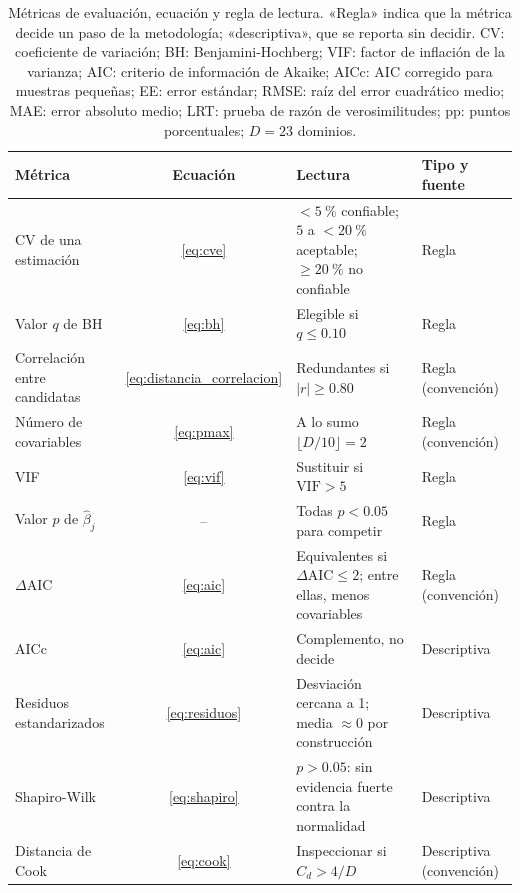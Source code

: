 \begin{table}[!htbp]
\centering
\small
\caption{Métricas de evaluación, ecuación y regla de lectura. «Regla» indica que la métrica decide un paso de la metodología; «descriptiva», que se reporta sin decidir. CV: coeficiente de variación; BH: Benjamini-Hochberg; VIF: factor de inflación de la varianza; AIC: criterio de información de Akaike; AICc: AIC corregido para muestras pequeñas; EE: error estándar; RMSE: raíz del error cuadrático medio; MAE: error absoluto medio; LRT: prueba de razón de verosimilitudes; pp: puntos porcentuales; $D = 23$ dominios.}
\label{tab:criterios_decision}
\renewcommand{\arraystretch}{1.2}
\begin{tabularx}{\linewidth}{>{\raggedright\arraybackslash}p{3.0cm} c >{\raggedright\arraybackslash}X >{\raggedright\arraybackslash}p{2.2cm}}
\toprule
Métrica & Ecuación & Lectura & Tipo y fuente \\
\midrule
CV de una estimación & \ref{eq:cve} & $<5~\%$ confiable; $5$ a $<20~\%$ aceptable; $\geq 20~\%$ no confiable & Regla \cite{DANE_GEIH_Metodologia2016, Molina2019} \\
Valor $q$ de BH & \ref{eq:bh} & Elegible si $q \leq 0.10$ & Regla \cite{BenjaminiHochberg1995} \\
Correlación entre candidatas & \ref{eq:distancia_correlacion} & Redundantes si $|r| \geq 0.80$ & Regla (convención) \\
Número de covariables & \ref{eq:pmax} & A lo sumo $\lfloor D/10 \rfloor = 2$ & Regla (convención) \\
VIF & \ref{eq:vif} & Sustituir si $\text{VIF} > 5$ & Regla \cite{MontgomeryPeckVining2012} \\
Valor $p$ de $\hat{\beta}_j$ & -- & Todas $p < 0.05$ para competir & Regla \cite{morales2021smallarea} \\
$\Delta$AIC & \ref{eq:aic} & Equivalentes si $\Delta\text{AIC} \leq 2$; entre ellas, menos covariables & Regla (convención) \\
AICc & \ref{eq:aic} & Complemento, no decide & Descriptiva \cite{HurvichTsai1989} \\
Residuos estandarizados & \ref{eq:residuos} & Desviación cercana a 1; media $\approx 0$ por construcción & Descriptiva \\
Shapiro-Wilk & \ref{eq:shapiro} & $p > 0.05$: sin evidencia fuerte contra la normalidad & Descriptiva \cite{ShapiroWilk1965} \\
Distancia de Cook & \ref{eq:cook} & Inspeccionar si $C_d > 4/D$ & Descriptiva (convención) \\

\end{tabularx}
\end{table}
